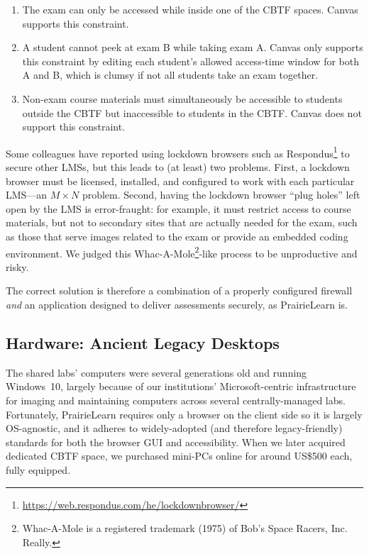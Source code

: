 \begin{enumerate}

\item The exam can only be accessed while inside one of the CBTF
  spaces.  Canvas supports this constraint.

\item A student cannot peek at exam B while taking exam A.
    Canvas only
    supports this constraint by editing each student's
    allowed access-time window for both A and B,
    which is clumsy if not all students take an exam together.

 \item  Non-exam course materials must simultaneously be accessible to
   students outside the CBTF but inaccessible to students in the CBTF.
  Canvas does not support this constraint.

\end{enumerate}

Some colleagues have reported using lockdown browsers such as
Respondus\footnote{\url{https://web.respondus.com/he/lockdownbrowser/}}
to secure other LMSs, but this leads to (at least) two problems.
First, a lockdown browser must be licensed, installed, and configured to work
with each particular LMS---an $M\times N$ problem.  Second,
having the lockdown browser ``plug holes'' left open by the LMS is error-fraught:
for example, it must restrict access to course materials, but not
to secondary sites
that are actually needed for the exam, such as those that serve images
related to the exam
or provide an embedded coding environment.
We judged this
Whac-A-Mole\footnote{Whac-A-Mole is a registered trademark (1975) of
Bob's Space Racers, Inc. Really.}-like process to be unproductive and risky.

The correct solution is therefore a combination of a properly configured 
firewall \emph{and\/} an application 
designed to deliver  assessments securely, as PrairieLearn is.

\subsection{Hardware: Ancient Legacy Desktops}


The shared labs' computers were several generations old and running
Windows~10, largely because of our institutions' Microsoft-centric
infrastructure for imaging and maintaining computers across several
centrally-managed labs.   
Fortunately, PrairieLearn requires only a browser on the client side
so it is
largely OS-agnostic, and it adheres to widely-adopted (and therefore
legacy-friendly) standards for both 
the browser GUI and accessibility.
When we later acquired dedicated CBTF space, 
we purchased mini-PCs online for around US\$500 each, fully equipped.

